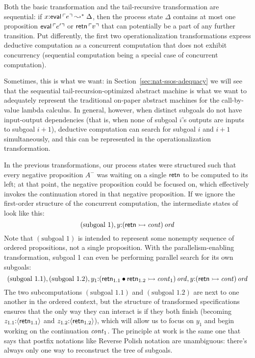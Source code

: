Both the basic transformation and the tail-recursive transformation
are sequential: if $x{:}{\sf eval}\,{\ulcorner{e}\urcorner} \leadsto^* \Delta$,
then the process state $\Delta$ contains at most one proposition ${\sf
  eval}\,{\ulcorner{e'}\urcorner}$ or ${\sf retn}\,{\ulcorner{v}\urcorner}$ that can potentially
be a part of any further transition. Put differently, the first two
operationalization transformations express deductive computation as a
concurrent computation that does not exhibit concurrency (sequential
computation being a special case of concurrent computation).

Sometimes, this is what we want: in
Section~\ref{sec:nat-ssos-adequacy} we will see that the sequential
tail-recursion-optimized abstract machine is what we want to
adequately represent the traditional on-paper abstract machines for
the call-by-value lambda calculus. In general, however, when distinct
subgoals do not have input-output dependencies (that is, when none of
subgoal $i$'s outputs are inputs to subgoal $i+1$), deductive computation
can search for subgoal $i$ and $i+1$ simultaneously, and this can 
be represented in the operationalization transformation.

In the previous transformations, our process states were structured
such that every negative proposition $A^-$ was waiting on a single
${\sf retn}$ to be computed to its left; at that point, the negative
proposition could be focused on, which effectively invokes the
continuation stored in that negative proposition. If we ignore the
first-order structure of the concurrent computation, the intermediate
states of look like this:
\[
  (\mbox{subgoal 1}), y{:}{({\sf retn} \rightarrowtail {\it cont})}\,{{\it ord}}
\]
Note that $(\mbox{subgoal 1})$ is intended to represent some nonempty
sequence of ordered propositions, not a single proposition. With the
parallelism-enabling transformation, subgoal 1 can even be performing
parallel search for its own subgoals:
\[
 (\mbox{subgoal 1.1}), (\mbox{subgoal 1.2}), 
   y_1{:}{({\sf retn}_{1.1} \mathbin{\bullet} {\sf retn}_{1.2} \rightarrowtail {\it cont}_1)}\,{{\it ord}}, 
   y{:}{({\sf retn} \rightarrowtail {\it cont})}\,{{\it ord}}
\]
The two subcomputations $(\mbox{subgoal 1.1})$ and $(\mbox{subgoal
  1.2})$ are next to one another in the ordered context, but the
structure of transformed specifications ensures that the only way they
can interact is if they both finish (becoming $z_{1.1}{:}\langle {{\sf
    retn}_{1.1}} \rangle$ and $z_{1.2}{:}\langle {{\sf retn}_{1.2}} \rangle$), which will
allow us to focus on $y_1$ and begin working on the continuation ${\it
  cont}_1$. The principle at work is the same one that says that postfix
notations like Reverse Polish notation are unambiguous: there's always
only one way to reconstruct the tree of subgoals. 

